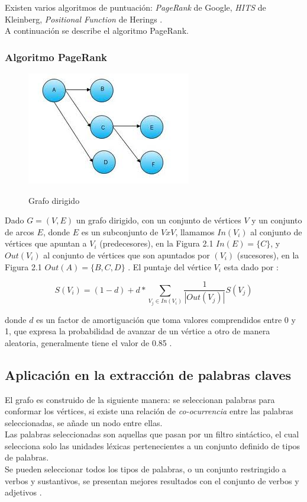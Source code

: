 Existen varios algoritmos de puntuaci\'on: \emph{PageRank} de Google,
\emph{HITS} de Kleinberg, \emph{Positional Function} de Herings \cite{RM04}. \\

A continuaci\'on se describe el algoritmo PageRank.

\subsubsection{Algoritmo PageRank}
\begin{figure}
	\centering
		\includegraphics[]{recursos/img/grafo.jpg} \\
		\caption {Grafo dirigido}
\end{figure}

Dado $G=(V,E)$ un grafo dirigido, con un conjunto de v\'ertices $V$ y un conjunto
de arcos $E$, donde $E$ es un subconjunto de $V x V$, llamamos $In(V_i)$ al
conjunto de v\'ertices que apuntan a $V_i$ (predecesores),  en la Figura 2.1
$In(E)=\{C\}$, y $Out(V_i)$ al conjunto de v\'ertices que son apuntados por $(V_i)$
(sucesores), en la Figura 2.1 $Out(A)=\{B,C,D\}$ . El puntaje del v\'ertice $V_i$ 
esta dado por \cite{SBLP98}:

\begin{equation}
	S(V_i) = (1 - d) + d * \sum_{V_j\in In(V_i)}{\frac{1}{|Out(V_j)|}S(V_j)}
\end{equation}

donde $d$ es un factor de amortiguaci\'on que toma valores comprendidos entre
0 y 1, que expresa la probabilidad de avanzar de un v\'ertice a otro de manera
aleatoria, generalmente tiene el valor de 0.85 \cite{SBLP98}.

\subsection{Aplicaci\'on en la extracci\'on de palabras claves}
El grafo es construido de la siguiente manera: se seleccionan palabras  para 
conformar los v\'ertices, si existe una relaci\'on de \emph{co-ocurrencia} entre 
las palabras seleccionadas, se a\~nade un nodo entre ellas. \\

Las palabras seleccionadas son aquellas que pasan por un filtro sint\'actico, el cual
selecciona solo las unidades l\'exicas pertenecientes a un conjunto definido de tipos
de palabras. \\

Se pueden seleccionar todos los tipos de palabras, o un conjunto restringido a verbos
y sustantivos, se presentan mejores resultados con el conjunto de verbos y
adjetivos \cite{RMPT04} .
